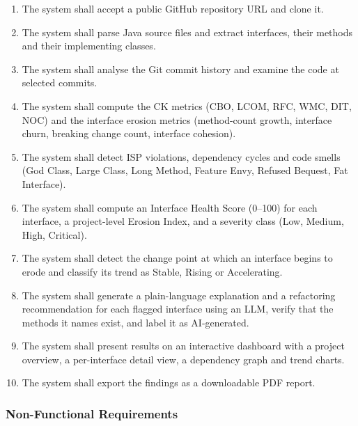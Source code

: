\documentclass[12pt,a4paper]{article}
\begin{document}
\begin{enumerate}[leftmargin=*,itemsep=2pt,label=FR\arabic*.]
  \item The system shall accept a public GitHub repository URL and clone it.

  \item The system shall parse Java source files and extract interfaces,
        their methods and their implementing classes.

  \item The system shall analyse the Git commit history and examine the
        code at selected commits.

  \item The system shall compute the CK metrics (CBO, LCOM, RFC, WMC, DIT,
        NOC) and the interface erosion metrics (method-count growth,
        interface churn, breaking change count, interface cohesion).

  \item The system shall detect ISP violations, dependency cycles and code
        smells (God Class, Large Class, Long Method, Feature Envy,
        Refused Bequest, Fat Interface).

  \item The system shall compute an Interface Health Score (0--100) for
        each interface, a project-level Erosion Index, and a severity
        class (Low, Medium, High, Critical).

  \item The system shall detect the change point at which an interface
        begins to erode and classify its trend as Stable, Rising or
        Accelerating.

  \item The system shall generate a plain-language explanation and a
        refactoring recommendation for each flagged interface using an
        LLM, verify that the methods it names exist, and label it as
        AI-generated.

  \item The system shall present results on an interactive dashboard
        with a project overview, a per-interface detail view, a dependency
        graph and trend charts.

  \item The system shall export the findings as a downloadable PDF report.
\end{enumerate}

\subsubsection{Non-Functional Requirements}
\end{document}
